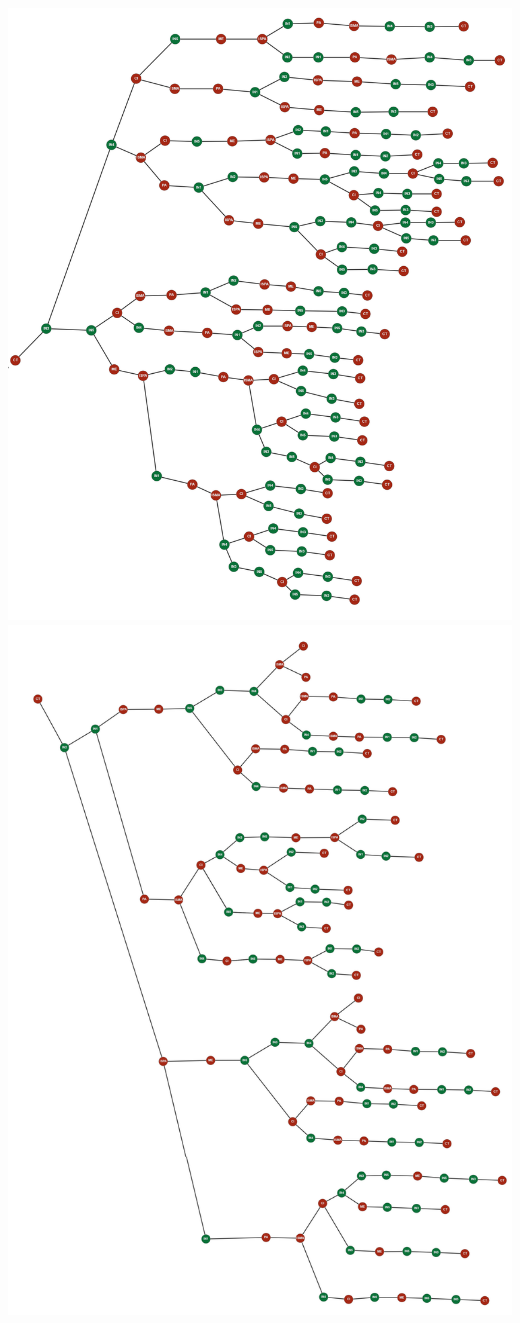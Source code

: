 \documentclass[12pt]{article}
\begin{document}
    \includegraphics[scale=0.25]{anexos/ArvoreFinal2.png}
    \newpage
    \includegraphics[scale=0.23]{anexos/ArvoreFinal1.png}
\end{document}
